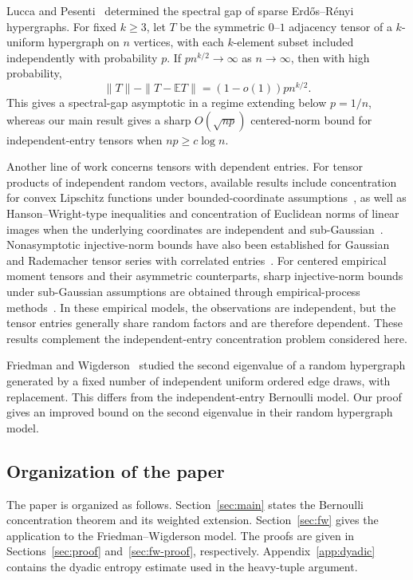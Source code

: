 \documentclass[11pt,reqno]{amsart}
\numberwithin{equation}{section}
\theoremstyle{definition}
\theoremstyle{remark}
\newcommand{\E}{\mathbb E}
\begin{document}
Lucca and Pesenti~\cite[Theorem~1.3]{LP26} determined the
spectral gap of sparse Erd\H{o}s--R\'enyi hypergraphs.
For fixed $k\ge3$, let $T$ be the symmetric $0$--$1$ adjacency
tensor of a $k$-uniform hypergraph on $n$ vertices, with each
$k$-element subset included independently with probability $p$.
If $pn^{k/2}\to\infty$ as $n\to\infty$, then with high probability,
\[
 \|T\|-\|T-\E T\|=(1-o(1))pn^{k/2}.
\]
This gives a spectral-gap asymptotic in a regime extending below
$p=1/n$, whereas our main result gives a sharp $O(\sqrt{np})$
centered-norm bound for independent-entry tensors when $np\ge c\log n$.

Another line of work concerns tensors with dependent entries.
For tensor products of independent random vectors, available results include
concentration for convex Lipschitz functions under bounded-coordinate
assumptions~\cite{V20}, as well as Hanson--Wright-type inequalities
and concentration of Euclidean norms of linear images when the underlying
coordinates are independent and sub-Gaussian~\cite{BKW22,V20}.
Nonasymptotic injective-norm bounds have also been established for Gaussian
and Rademacher tensor series with correlated entries~\cite{BGJLR24}.
For centered empirical moment tensors and their asymmetric counterparts,
sharp injective-norm bounds under sub-Gaussian assumptions are obtained
through empirical-process methods~\cite{ACS25,CS26}.
In these empirical models, the observations are independent, but the
tensor entries generally share random factors and are therefore dependent.
These results complement the independent-entry concentration problem
considered here.

Friedman and Wigderson~\cite{FW95}
studied the second eigenvalue of a random hypergraph generated by a
fixed number of independent uniform ordered edge draws, with replacement.
This differs from the independent-entry Bernoulli model. Our proof gives an improved bound on the second eigenvalue in their random hypergraph model.


\subsection*{Organization of the paper}
The paper is organized as follows. Section~\ref{sec:main} states
the Bernoulli concentration theorem and its weighted extension.
Section~\ref{sec:fw} gives the application to the
Friedman--Wigderson model. The proofs are given in
Sections~\ref{sec:proof} and~\ref{sec:fw-proof}, respectively.
Appendix~\ref{app:dyadic} contains the dyadic entropy estimate used
in the heavy-tuple argument.
\end{document}
